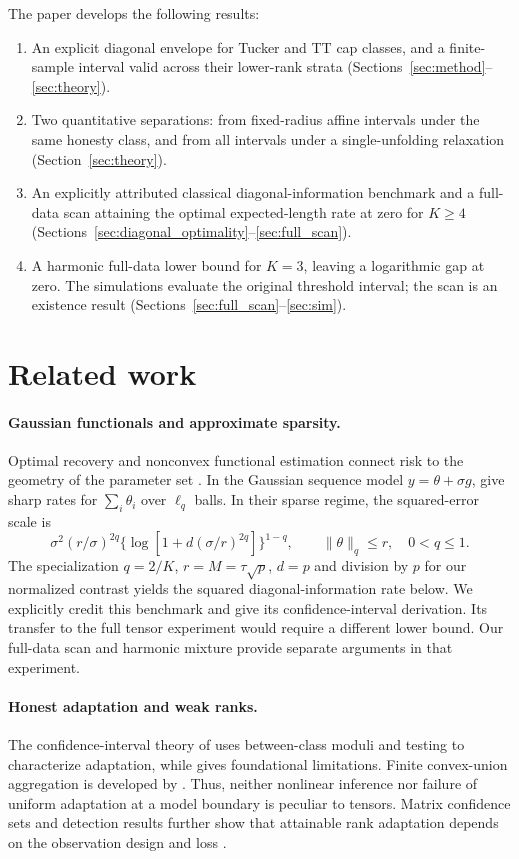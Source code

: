\documentclass[11pt]{article}
\theoremstyle{remark}
\newcommand{\norm}[1]{\lVert #1\rVert}
\begin{document}
The paper develops the following results:
\begin{enumerate}
\item An explicit diagonal envelope for Tucker and TT cap classes, and a finite-sample interval valid across their lower-rank strata (Sections~\ref{sec:method}--\ref{sec:theory}).
\item Two quantitative separations: from fixed-radius affine intervals under the same honesty class, and from all intervals under a single-unfolding relaxation (Section~\ref{sec:theory}).
\item An explicitly attributed classical diagonal-information benchmark and a full-data scan attaining the optimal expected-length rate at zero for $K\ge4$ (Sections~\ref{sec:diagonal_optimality}--\ref{sec:full_scan}).
\item A harmonic full-data lower bound for $K=3$, leaving a logarithmic gap at zero. The simulations evaluate the original threshold interval; the scan is an existence result (Sections~\ref{sec:full_scan}--\ref{sec:sim}).
\end{enumerate}

\section{Related work}\label{sec:related}

\paragraph{Gaussian functionals and approximate sparsity.}
Optimal recovery and nonconvex functional estimation connect risk to the geometry of the parameter set \citep{donoho1994,cailownonconvex2004}. In the Gaussian sequence model $y=\theta+\sigma g$, \citet{collier2017} give sharp rates for $\sum_i\theta_i$ over $\ell_q$ balls. In their sparse regime, the squared-error scale is
\[
 \sigma^2(r/\sigma)^{2q}
 \{\log[1+d(\sigma/r)^{2q}]\}^{1-q},
 \qquad \norm\theta_q\le r,\quad 0<q\le1.
\]
The specialization $q=2/K$, $r=M=\tau\sqrt p$, $d=p$ and division by $p$ for our normalized contrast yields the squared diagonal-information rate below. We explicitly credit this benchmark and give its confidence-interval derivation. Its transfer to the full tensor experiment would require a different lower bound. Our full-data scan and harmonic mixture provide separate arguments in that experiment.

\paragraph{Honest adaptation and weak ranks.}
The confidence-interval theory of \citet{cailow2004} uses between-class moduli and testing to characterize adaptation, while \citet{low1997} gives foundational limitations. Finite convex-union aggregation is developed by \citet{juditskynemirovski2020}. Thus, neither nonlinear inference nor failure of uniform adaptation at a model boundary is peculiar to tensors. Matrix confidence sets and detection results further show that attainable rank adaptation depends on the observation design and loss \citep{carpentieretal2018,carpentiernickl2015}.
\end{document}
